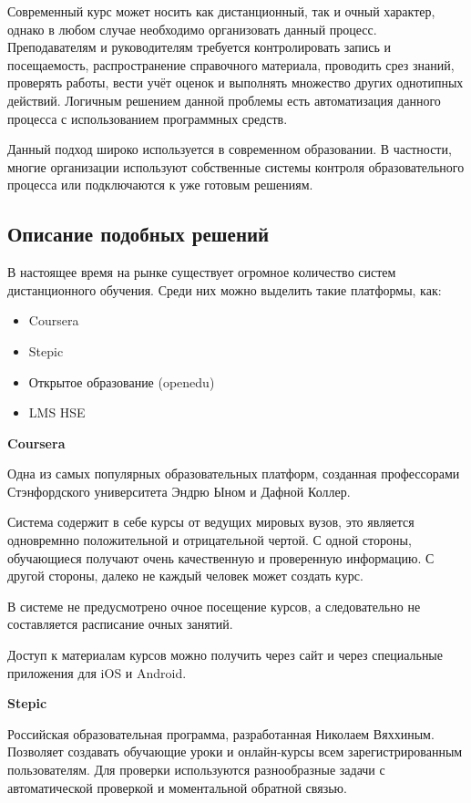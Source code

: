 \documentclass[a4paper,14pt]{article}
\begin{document}
Современный курс может носить как дистанционный, так и очный характер, однако в любом случае необходимо организовать данный процесс.
Преподавателям и руководителям требуется контролировать запись и посещаемость, распространение справочного материала, проводить срез знаний, проверять работы, вести учёт оценок и выполнять множество других однотипных действий.
Логичным решением данной проблемы есть автоматизация данного процесса с использованием программных средств.

Данный подход широко используется в современном образовании. В частности, многие организации используют собственные системы контроля образовательного процесса или подключаются к уже готовым решениям.

\subsection{Описание подобных решений}

В настоящее время на рынке существует огромное количество систем дистанционного обучения. Среди них можно выделить такие платформы, как:
\begin{itemize}
	\item Coursera
	\item Stepic
	\item Открытое образование (openedu)
	\item LMS HSE
\end{itemize}

\textbf{Coursera}

Одна из самых популярных образовательных платформ, созданная профессорами Стэнфордского университета Эндрю Ыном и Дафной Коллер. 

Система содержит в себе курсы от ведущих мировых вузов, это является одновремнно положительной и отрицательной чертой. С одной стороны, обучающиеся получают  очень качественную и проверенную информацию. С другой стороны, далеко не каждый человек может создать курс.

В системе не предусмотрено очное посещение курсов, а следовательно не составляется расписание очных занятий.

Доступ к материалам курсов можно получить через сайт и через специальные приложения для iOS и Android.

\textbf{Stepic}

Российская образовательная программа, разработанная Николаем Вяххиным. Позволяет создавать обучающие уроки и онлайн-курсы всем зарегистрированным пользователям. Для проверки используются разнообразные задачи с автоматической проверкой и моментальной обратной связью.
\end{document}
